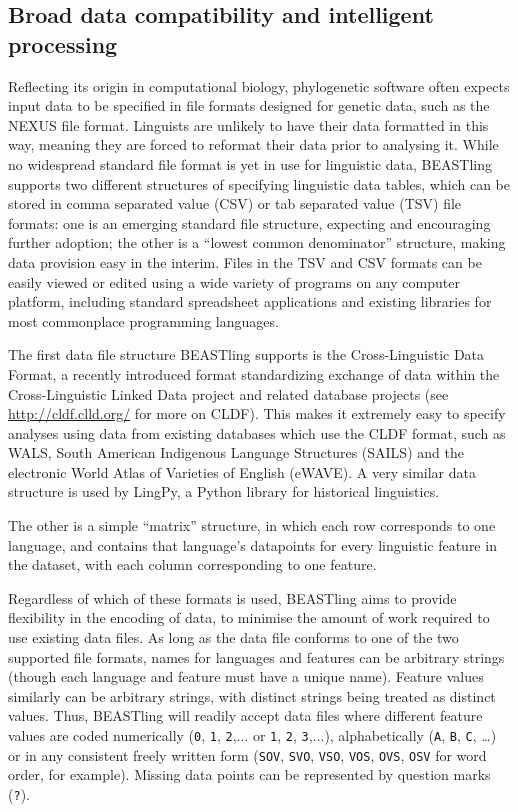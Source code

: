 \documentclass[10pt,a4paper]{article}
\begin{document}
\subsection{Broad data compatibility and intelligent processing}

Reflecting its origin in computational biology, phylogenetic software often expects input data to be specified in file formats designed for genetic data, such as the NEXUS file format\cite{Maddison1997}.  Linguists are unlikely to have their data formatted in this way, meaning they are forced to reformat their data prior to analysing it. While no widespread standard file format is yet in use for linguistic data, BEASTling supports two different structures of specifying linguistic data tables, which can be stored in comma separated value (CSV) or tab separated value (TSV) file formats: one is an emerging standard file structure, expecting and encouraging further adoption; the other is a ``lowest common denominator'' structure, making data provision easy in the interim. Files in the TSV and CSV formats can be easily viewed or edited using a wide variety of programs on any computer platform, including standard spreadsheet applications and existing libraries for most commonplace programming languages.

The first data file structure BEASTling supports is the Cross-Linguistic Data Format\cite{Forkel2016}, a recently introduced format standardizing exchange of data within the Cross-Linguistic Linked Data project and related database projects (see \url{http://cldf.clld.org/} for more on CLDF).  This makes it extremely easy to specify analyses using data from existing databases which use the CLDF format, such as WALS, South American Indigenous Language Structures\cite{Muysken2014} (SAILS) and the electronic World Atlas of Varieties of English\cite{Kortmann2013} (eWAVE). A very similar data structure is used by LingPy\cite{List2016}, a Python library for historical linguistics.

The other is a simple ``matrix'' structure, in which each row corresponds to one language, and contains that language's datapoints for every linguistic feature in the dataset, with each column corresponding to one feature.

Regardless of which of these formats is used, BEASTling aims to provide flexibility in the encoding of data, to minimise the amount of work required to use existing data files.  As long as the data file conforms to one of the two supported file formats, names for languages and features can be arbitrary strings (though each language and feature must have a unique name).  Feature values similarly can be arbitrary strings, with distinct strings being treated as distinct values.  Thus, BEASTling will readily accept data files where different feature values are coded numerically (\texttt{0}, \texttt{1}, \texttt{2},$\ldots$ or \texttt{1}, \texttt{2}, \texttt{3},$\ldots$), alphabetically (\texttt{A}, \texttt{B}, \texttt{C}, \ldots) or in any consistent freely written form (\texttt{SOV}, \texttt{SVO}, \texttt{VSO}, \texttt{VOS}, \texttt{OVS}, \texttt{OSV} for word order, for example).  Missing data points can be represented by question marks (\texttt{?}).
\end{document}
